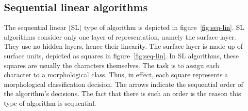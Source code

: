 {%

\subsection{Sequential linear algorithms}
\label{subsec:seq-lin}

The sequential linear (SL) type of algorithm is depicted in figure~\ref{fig:seq-lin}. 
SL algorithms consider only one layer of representation, namely the surface layer. 
They use no hidden layers, hence their linearity. The surface layer is made up of surface units, depicted as squares in figure~\ref{fig:seq-lin}.
In SL algorithms, these squares are usually the characters themselves. 
The task is to assign each character to a morphological class. Thus, in effect, 
each square represents a morphological classification decision.
The arrows indicate the sequential order of the algorithm's decisions. 
The fact that there is such an order is the reason this type of algorithm is sequential.

}
